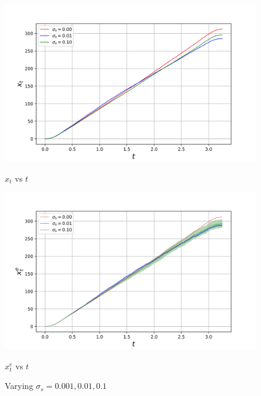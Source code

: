 \begin{figure}[H]
    \centering
    \begin{minipage}{0.49\linewidth}
        \centering
        \includegraphics[width=\linewidth]{plots/part1-d.2-xt.png}
        \caption*{$x_t$ vs $t$}

    \end{minipage}
    \hfill
    \begin{minipage}{0.49\linewidth}
        \centering
        \includegraphics[width=\linewidth]{plots/part1-d.2-xe.png}
         \caption*{$x_t^e$ vs $t$}


    \end{minipage}
    \caption{Varying $\sigma_s = 0.001, 0.01, 0.1$}
    \label{fig:part1-vary-sigma_s}
    

\end{figure}

